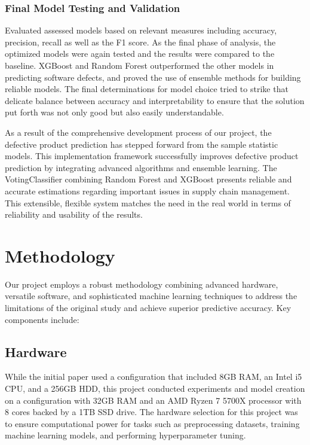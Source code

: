 \documentclass[conference]{IEEEtran}
\begin{document}
\subsubsection{Final Model Testing and Validation}
Evaluated assessed models based on relevant measures including accuracy, precision, recall as well as the F1 score. As the final phase of analysis, the optimized models were again tested and the results were compared to the baseline. XGBoost and Random Forest outperformed the other models in predicting software defects, and proved the use of ensemble methods for building reliable models. The final determinations for model choice tried to strike that delicate balance between accuracy and interpretability to ensure that the solution put forth was not only good but also easily understandable.

As a result of the comprehensive development process of our project, the defective product prediction has stepped forward from the sample statistic models. This implementation framework successfully improves defective product prediction by integrating advanced algorithms and ensemble learning. The VotingClassifier combining Random Forest and XGBoost presents reliable and accurate estimations regarding important issues in supply chain management. This extensible, flexible system matches the need in the real world in terms of reliability and usability of the results.



\section{Methodology}
Our project employs a robust methodology combining advanced hardware, versatile software, and sophisticated machine learning techniques to address the limitations of the original study and achieve superior predictive accuracy. Key components include:

\subsection{Hardware}

While the initial paper used a configuration that included 8GB RAM, an Intel i5 CPU, and a 256GB HDD, this project conducted experiments and model creation on a configuration with 32GB RAM and an AMD Ryzen 7 5700X processor with 8 cores backed by a 1TB SSD drive. The hardware selection for this project was to ensure computational power for tasks such as preprocessing datasets, training machine learning models, and performing hyperparameter tuning.
\end{document}
